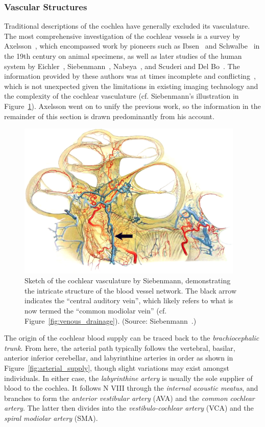 \subsubsection{Vascular Structures}
\label{sect:cochlear_vessels}

Traditional descriptions of the cochlea have generally excluded its vasculature.
The most comprehensive investigation of the cochlear vessels is a survey by
Axelsson~\cite{axelsson1968}, which encompassed work by pioneers such as
Ibsen~\cite{ibsen1881} and Schwalbe~\cite{schwalbe1887} in the 19th century on
animal specimens, as well as later studies of the human system by
Eichler~\cite{eichler1892}, Siebenmann~\cite{siebenmann1894},
Nabeya~\cite{nabeya1923}, and Scuderi and Del Bo~\cite{scuderi1952}. The
information provided by these authors was at times incomplete and
conflicting~\cite{axelsson1968}, which is not unexpected given the limitations
in existing imaging technology and the complexity of the cochlear vasculature
(cf. Siebenmann's illustration in Figure~\ref{fig:siebenmann}). Axelsson went on
to unify the previous work, so the information in the remainder of this section
is drawn predominantly from his account.

\begin{figure}
	\centering
	\includegraphics[height=7.5cm]{Background/siebenmann}
	\caption[Sketch of the cochlear vasculature]{Sketch of the cochlear vasculature
	by Siebenmann, demonstrating the intricate structure of the blood vessel
	network. The black arrow indicates the ``central auditory vein'', which likely
	refers to what is now termed the ``common modiolar vein'' (cf.
	Figure~\ref{fig:venous_drainage}). (Source: Siebenmann~\cite{siebenmann1894}.)}
	\label{fig:siebenmann}
\end{figure}

The origin of the cochlear blood supply can be traced back to the
\emph{brachiocephalic trunk}. From here, the arterial path typically follows the
vertebral, basilar, anterior inferior cerebellar, and labyrinthine arteries in
order as shown in Figure~\ref{fig:arterial_supply}, though slight variations may
exist amongst individuals. In either case, the \emph{labyrinthine artery} is
usually the sole supplier of blood to the cochlea. It follows N VIII through the
\emph{internal acoustic meatus}, and branches to form the \emph{anterior
vestibular artery} (AVA) and the \emph{common cochlear artery}. The latter then
divides into the \emph{vestibulo-cochlear artery} (VCA) and the \emph{spiral
modiolar artery} (SMA).

